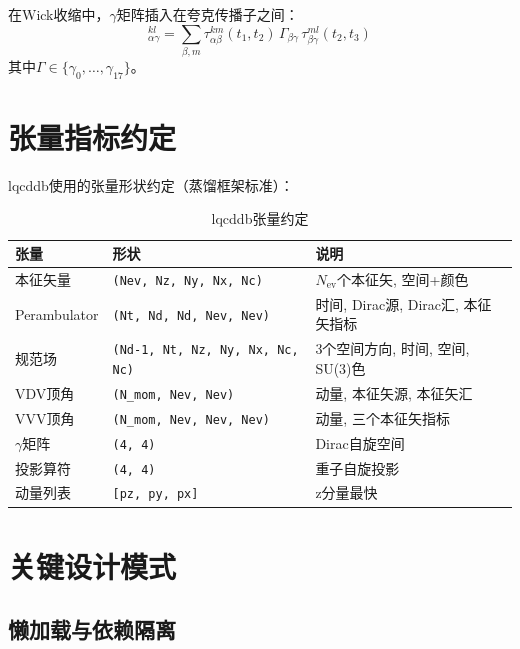 \documentclass[11pt,a4paper]{ctexart}
\begin{document}
在Wick收缩中，$\gamma$矩阵插入在夸克传播子之间：
\begin{equation}
[\tau(t_1, t_2) \, \Gamma \, \tau(t_2, t_3)]_{\alpha\gamma}^{kl}
= \sum_{\beta, m} \tau_{\alpha\beta}^{km}(t_1, t_2) \, \Gamma_{\beta\gamma} \, \tau_{\beta\gamma}^{ml}(t_2, t_3)
\end{equation}
其中$\Gamma \in \{\gamma_0, \dots, \gamma_{17}\}$。

\section{张量指标约定}

lqcddb使用的张量形状约定（蒸馏框架标准）：

\begin{table}[h]
\centering
\begin{tabular}{@{}lll@{}}
\toprule
张量 & 形状 & 说明 \\
\midrule
本征矢量 & \texttt{(Nev, Nz, Ny, Nx, Nc)} & $N_{\mathrm{ev}}$个本征矢, 空间+颜色 \\
Perambulator & \texttt{(Nt, Nd, Nd, Nev, Nev)} & 时间, Dirac源, Dirac汇, 本征矢指标 \\
规范场 & \texttt{(Nd-1, Nt, Nz, Ny, Nx, Nc, Nc)} & 3个空间方向, 时间, 空间, SU(3)色 \\
VDV顶角 & \texttt{(N\_mom, Nev, Nev)} & 动量, 本征矢源, 本征矢汇 \\
VVV顶角 & \texttt{(N\_mom, Nev, Nev, Nev)} & 动量, 三个本征矢指标 \\
$\gamma$矩阵 & \texttt{(4, 4)} & Dirac自旋空间 \\
投影算符 & \texttt{(4, 4)} & 重子自旋投影 \\
动量列表 & \texttt{[pz, py, px]} & z分量最快 \\
\bottomrule
\end{tabular}
\caption{lqcddb张量约定}
\end{table}

\section{关键设计模式}

\subsection{懒加载与依赖隔离}
\end{document}
